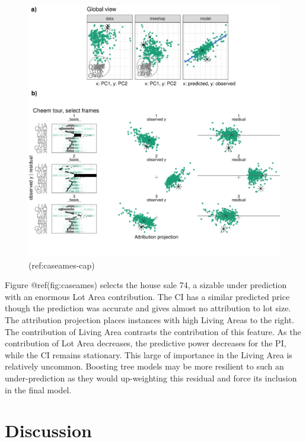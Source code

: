 \documentclass[
]{article}
\begin{document}
\begin{figure}

{\centering \includegraphics[width=1\linewidth]{./figures/case_ames2018} 

}

\caption{(ref:caseames-cap)}\label{fig:caseames}
\end{figure}

Figure @ref(fig:caseames) selects the house sale 74, a sizable under
prediction with an enormous Lot Area contribution. The CI has a similar
predicted price though the prediction was accurate and gives almost no
attribution to lot size. The attribution projection places instances
with high Living Areas to the right. The contribution of Living Area
contrasts the contribution of this feature. As the contribution of Lot
Area decreases, the predictive power decreases for the PI, while the CI
remains stationary. This large of importance in the Living Area is
relatively uncommon. Boosting tree models may be more resilient to such
an under-prediction as they would up-weighting this residual and force
its inclusion in the final model.

\hypertarget{sec:cheemdiscussion}{%
\section{Discussion}\label{sec:cheemdiscussion}}
\end{document}
